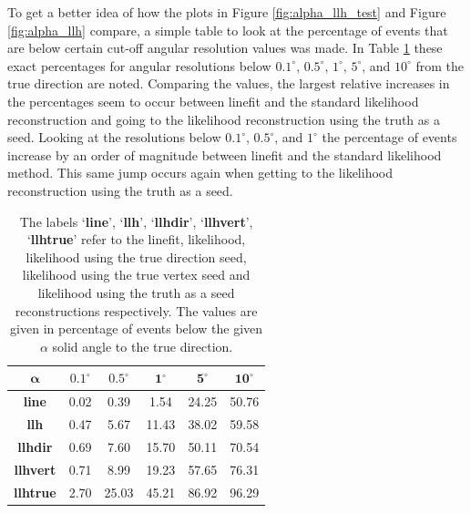To get a better idea of how the plots in Figure \ref{fig:alpha_llh_test} and Figure \ref{fig:alpha_llh} compare, a simple table to look at the percentage of events that are below certain cut-off angular resolution values was made. In Table \ref{tab:alpha_comp} these exact percentages for angular resolutions below $0.1^{\circ}$, $0.5^{\circ}$, $1^{\circ}$, $5^{\circ}$, and $10^{\circ}$ from the true direction are noted. Comparing the values, the largest relative increases in the percentages seem to occur between linefit and the standard likelihood reconstruction and going to the likelihood reconstruction using the truth as a seed. Looking at the resolutions below $0.1^{\circ}$, $0.5^{\circ}$, and $1^{\circ}$ the percentage of events increase by an order of magnitude between linefit and the standard likelihood method. This same jump occurs again when getting to the likelihood reconstruction using the truth as a seed. 

\begin{table}[H]
  \centering
  \begin{tabular}{|c|c|c|c|c|c|} 
    \hline
    $\mathbf{\alpha}$ & $\mathbf{0.1^{\circ}}$ & $\mathbf{0.5^{\circ}}$ & $\mathbf{1^{\circ}}$ & $\mathbf{5^{\circ}}$ & $\mathbf{10^{\circ}}$ \\
    \hline
    \textbf{line} & 0.02 & 0.39 & 1.54 & 24.25 & 50.76 \\
    \hline
    \textbf{llh} & 0.47 & 5.67 & 11.43 & 38.02 & 59.58 \\
    \hline
    \textbf{llhdir} & 0.69 & 7.60 & 15.70 & 50.11 & 70.54 \\
    \hline
    \textbf{llhvert} & 0.71 & 8.99 & 19.23 & 57.65 & 76.31 \\
    \hline
    \textbf{llhtrue} & 2.70 & 25.03 & 45.21 & 86.92 & 96.29 \\
    \hline
  \end{tabular}
  \caption{The labels `\textbf{line}', `\textbf{llh}', `\textbf{llhdir}', `\textbf{llhvert}', `\textbf{llhtrue}' refer to the linefit, likelihood, likelihood using the true direction seed, likelihood using the true vertex seed and likelihood using the truth as a seed reconstructions respectively. The values are given in percentage of events below the given $\alpha$ solid angle to the true direction.} 
  \label{tab:alpha_comp}
\end{table}

